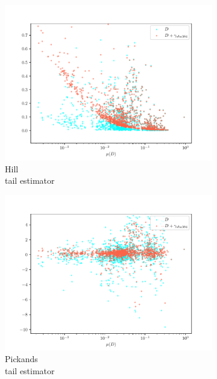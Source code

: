 \documentclass[12pt,a4paper,automark, toc=bib]{scrreprt}
\theoremstyle{definition}
\begin{document}
\begin{figure}
\begin{subfigure}{0.32\linewidth}
				\includegraphics[width=\linewidth]{figures/stat_sha384_0hill_est.pdf}
				\caption{Hill\\tail estimator}
			\end{subfigure}
			\begin{subfigure}{0.32\linewidth}
				\includegraphics[width=\linewidth]{figures/stat_sha384_0pickands_est.pdf}
				\caption{Pickands\\tail estimator}
			\end{subfigure}
			\begin{subfigure}{0.32\linewidth}

\end{subfigure}
\end{figure}
\end{document}
